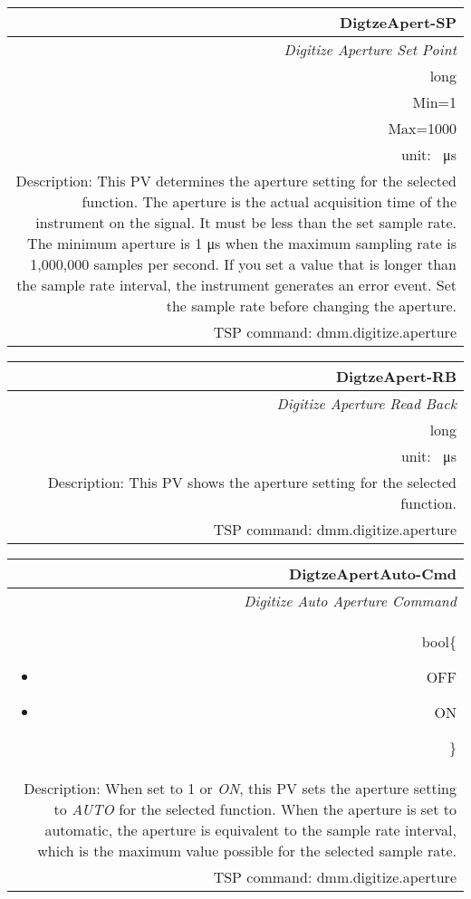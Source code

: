 \documentclass[openany]{article}
\begin{document}
		\begin{tabular}{N}
			\hline
			\bfseries DigtzeApert-SP\label{pv:digtzeapert-sp} \\ \hline
			\emph{Digitize Aperture Set Point} \\
			long \\
			Min=1 \\
			Max=1000 \\
			unit: \SI{}{\micro\second} \\
			Description: This PV determines the aperture setting for the selected function. The aperture is the actual acquisition time of the instrument on the signal. It must be less than the set sample rate. The minimum aperture is 1 μs when the maximum sampling rate is 1,000,000 samples per second. If you set a value that is longer than the sample rate interval, the instrument generates an error event. Set the sample rate before changing the aperture. \\
			TSP command: dmm.digitize.aperture
		\end{tabular}

		\begin{tabular}{N}
			\hline
			\bfseries DigtzeApert-RB\label{pv:digtzeapert-rb} \\ \hline
			\emph{Digitize Aperture Read Back} \\
			long \\
			unit: \SI{}{\micro\second} \\
			Description: This PV shows the aperture setting for the selected function. \\
			TSP command: dmm.digitize.aperture
		\end{tabular}

		\begin{tabular}{N}
			\hline
			\bfseries DigtzeApertAuto-Cmd\label{pv:digtzeapertauto-cmd} \\ \hline
			\emph{Digitize Auto Aperture Command} \\
			bool\{\begin{itemize}[noitemsep]
				\small
				\item[] OFF
				\item[] ON
			\end{itemize}\} \\
			Description: When set to 1 or \emph{ON}, this PV sets the aperture setting to \emph{AUTO} for the selected function. When the aperture is set to automatic, the aperture is equivalent to the sample rate interval, which is the maximum value possible for the selected sample rate. \\
			TSP command: dmm.digitize.aperture
		\end{tabular}
\end{document}
